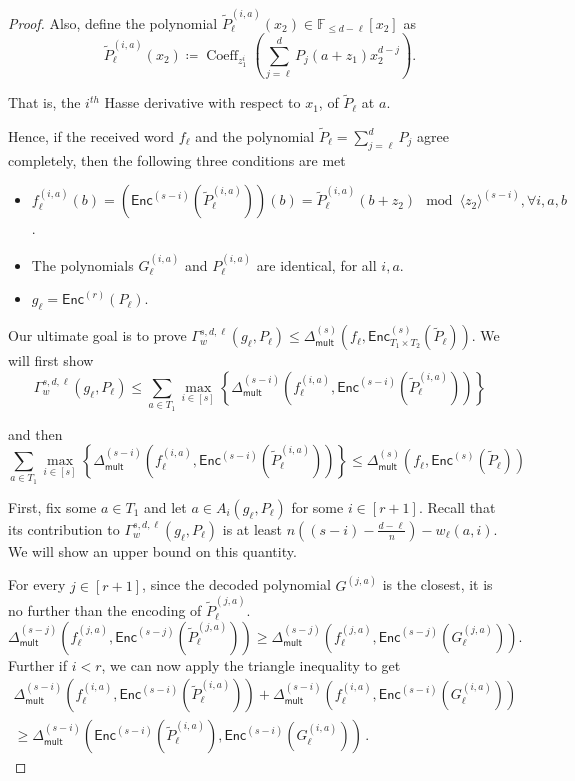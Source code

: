 \documentclass{article}
\def\Field{\mathbb{F}}
\let\F\Field
\renewcommand{\tilde}[1]{\widetilde{#1}}
\newcommand{\enc}{{\mathsf{Enc}}}
\newcommand{\encs}{{\mathsf{Enc}^{(s)}}}
\newcommand{\coeff}{\operatorname{Coeff}}
\newcommand{\Delm}{\Delta_{\mathsf{mult}}}
\begin{document}
\begin{proof}
		Also, define the polynomial $\tilde{P}_\ell^{(i,a)}(x_2)\in \F_{\leq d-\ell}[x_2]$ as  
		\[
		\tilde{P}_\ell^{(i,a)}(x_2) \coloneqq \coeff_{z_1^i}\left(\sum_{j=\ell}^{d}P_j\left(a+z_1\right)x_2^{d-j}\right).
		\]
		
		That is, the $i^{th}$ Hasse derivative with respect to $x_1$, of $\tilde{P}_\ell$ at $a$.
		
		Hence, if the received word $f_\ell$ and the polynomial $\tilde{P}_\ell = \sum_{j=\ell}
		^d P_j$ agree completely, then the following three conditions are met
		\begin{itemize}
			\item $f_\ell^{(i,a)}(b)=
			\left(\enc^{(s-i)}\left(\tilde{P}_{\ell}^{(i,a)}\right)\right)(b)=\tilde{P}_{\ell}^{(i,a)}\left(b+z_2\right)
			\mod \langle z_2 \rangle^{(s-i)}, \forall i,a,b$.
			\item The polynomials $G_\ell^{(i,a)}$ and $P_\ell^{(i,a)}$ are
			identical, for all $i,a$.
			\item $g_\ell= \enc^{(r)}(P_\ell)$.
		\end{itemize}    
		
		Our ultimate goal is to prove $\Gamma_{w}^{s, d, \ell}(g_{\ell}, P_{\ell}) \leq \Delm^{(s)}(f_\ell, \enc^{(s)}_{T_1\times T_2}(\tilde{P}_\ell))$. We will first show 
		\[ \Gamma_{w}^{s, d, \ell}(g_{\ell}, P_{\ell}) \leq \sum_{a \in T_1} \max_{i \in [s]} \left\{\Delm^{(s-i)} \left(f_{\ell}^{(i, a)}, \enc^{(s-i)}\left(\tilde{P}_{\ell}^{(i, a)}\right)\right)\right\} \]
		
		and then 
		\[ \sum_{a \in T_1} \max_{i \in [s]} \left\{\Delm^{(s-i)} \left(f_{\ell}^{(i, a)}, \enc^{(s-i)}\left(\tilde{P}_{\ell}^{(i, a)}\right)\right)\right\} \leq \Delm^{(s)} \left(f_\ell, \encs\left( \tilde{P}_\ell\right)\right) \]
		
		First, fix some $a \in T_1$ and let $a\in A_i \left(g_\ell, P_\ell\right)$ for some $i\in [r+1]$. Recall that its contribution to $\Gamma_{w}^{s, d, \ell}(g_{\ell}, P_{\ell})$ is at least $n\left((s-i) - \frac{d-\ell}n\right) - w_{\ell}(a,i)$. We will show an upper bound on this quantity.
		
		For every $j\in [r+1]$, since the decoded polynomial $G^{(j, a)}$ is the closest, it is no further than the encoding of $\tilde{P}_{\ell}^{(j, a)}$.
		\[ \Delm^{(s-j)} \left(f_{\ell}^{(j, a)}, \enc^{(s-j)}\left(\tilde{P}_{\ell}^{(j, a)}\right)\right) \geq  \Delm^{(s-j)} \left(f_{\ell}^{(j, a)}, \enc^{(s-j)}\left(G_{\ell}^{(j, a)} \right)\right). \] 
		Further if $i<r$, we can now apply the triangle inequality to get 
		\begin{multline*}\Delm^{(s-i)} \left(f_{\ell}^{(i, a)}, \enc^{(s-i)}\left(\tilde{P}_{\ell}^{(i,
			a)}\right)\right) + \Delm^{(s-i)} \left(f_{\ell}^{(i, a)},
		\enc^{(s-i)}\left(G_{\ell}^{(i, a)}\right)\right) \\
        \geq \Delm^{(s-i)}
		\left(\enc^{(s-i)}\left(\tilde{P}_{\ell}^{(i, a)}\right), \enc^{(s-i)}\left(G_{\ell}^{(i,
			a)}\right)\right)\,.\end{multline*}
		

\end{proof}
\end{document}
